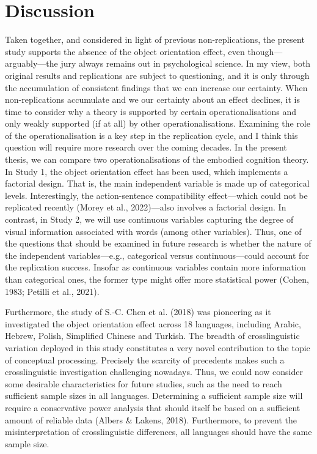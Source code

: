 \documentclass[
  12pt,
  man,floatsintext]{apa7}
\begin{document}
\hypertarget{discussion}{%
\section{Discussion}\label{discussion}}

Taken together, and considered in light of previous non-replications, the present study supports the absence of the object orientation effect, even though---arguably---the jury always remains out in psychological science. In my view, both original results and replications are subject to questioning, and it is only through the accumulation of consistent findings that we can increase our certainty. When non-replications accumulate and we our certainty about an effect declines, it is time to consider why a theory is supported by certain operationalisations and only weakly supported (if at all) by other operationalisations. Examining the role of the operationalisation is a key step in the replication cycle, and I think this question will require more research over the coming decades. In the present thesis, we can compare two operationalisations of the embodied cognition theory. In Study 1, the object orientation effect has been used, which implements a factorial design. That is, the main independent variable is made up of categorical levels. Interestingly, the action-sentence compatibility effect---which could not be replicated recently (Morey et al., 2022)---also involves a factorial design. In contrast, in Study 2, we will use continuous variables capturing the degree of visual information associated with words (among other variables). Thus, one of the questions that should be examined in future research is whether the nature of the independent variables---e.g., categorical versus continuous---could account for the replication success. Insofar as continuous variables contain more information than categorical ones, the former type might offer more statistical power (Cohen, 1983; Petilli et al., 2021).

Furthermore, the study of S.-C. Chen et al. (2018) was pioneering as it investigated the object orientation effect across 18 languages, including Arabic, Hebrew, Polish, Simplified Chinese and Turkish. The breadth of crosslinguistic variation deployed in this study constitutes a very novel contribution to the topic of conceptual processing. Precisely the scarcity of precedents makes such a crosslinguistic investigation challenging nowadays. Thus, we could now consider some desirable characteristics for future studies, such as the need to reach sufficient sample sizes in all languages. Determining a sufficient sample size will require a conservative power analysis that should itself be based on a sufficient amount of reliable data (Albers \& Lakens, 2018). Furthermore, to prevent the misinterpretation of crosslinguistic differences, all languages should have the same sample size.
\end{document}
